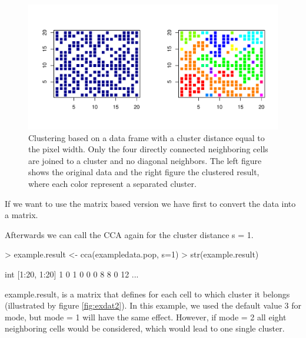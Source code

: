 \documentclass[10pt,a4paper]{article}
\begin{document}
\begin{figure}
\centering
\includegraphics{pics/exdat1.pdf}
\caption{Clustering based on a data frame with a cluster distance equal to the pixel width. Only the four directly connected neighboring cells are joined to a cluster and no diagonal neighbors. The left figure shows the original data and the right figure the clustered result, where each color represent a separated cluster.}
\label{fig:exdat1}
\end{figure}


If we want to use the matrix based version we have first to convert the data into a matrix.

\begin{Schunk}
\end{Schunk}

Afterwards we can call the CCA again for the cluster distance s = 1.

\begin{Schunk}
\begin{Sinput}
> example.result <- cca(exampledata.pop, s=1)
> str(example.result)
\end{Sinput}
\begin{Soutput}
 int [1:20, 1:20] 1 0 1 0 0 0 8 8 0 12 ...
\end{Soutput}
\end{Schunk}

example.result, is a matrix that defines for each cell to which cluster it belongs (illustrated by figure \ref{fig:exdat2}). In this example, we used the default value 3 for mode, but mode = 1 will have the same effect. However, if mode = 2 all eight neighboring cells would be considered, which would lead to one single cluster. 
\end{document}
